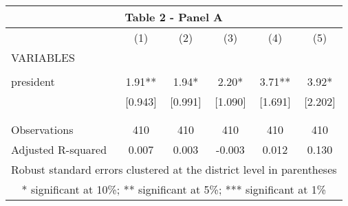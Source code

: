 \begin{tabular}{lccccc}
\multicolumn{6}{c}{Table 2 - Panel A} \\ \hline
 & (1) & (2) & (3) & (4) & (5) \\
VARIABLES &  &  &  &  &  \\ \hline
 &  &  &  &  &  \\
president & 1.91** & 1.94* & 2.20* & 3.71** & 3.92* \\
 & [0.943] & [0.991] & [1.090] & [1.691] & [2.202] \\
 &  &  &  &  &  \\
 &  &  &  &  &  \\
Observations & 410 & 410 & 410 & 410 & 410 \\
 Adjusted R-squared & 0.007 & 0.003 & -0.003 & 0.012 & 0.130 \\ \hline
\multicolumn{6}{c}{ Robust standard errors clustered at the district level in parentheses} \\
\multicolumn{6}{c}{ * significant at 10\%; ** significant at 5\%; *** significant at 1\%} \\
\end{tabular}
